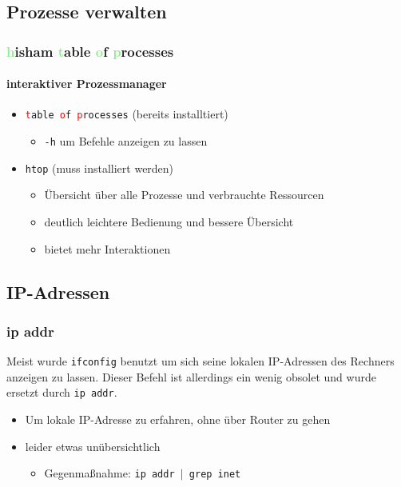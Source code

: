 \documentclass[12pt,utf8]{beamer}
\begin{document}
\subsection{Prozesse verwalten}
\begin{frame}
\frametitle{\textcolor{lightGreen}{h}isham \textcolor{lightGreen}{t}able \textcolor{lightGreen}{o}f \textcolor{lightGreen}{p}rocesses}
\framesubtitle{interaktiver Prozessmanager}
\begin{itemize}
	\item \texttt{\textcolor{red}{t}able \textcolor{red}{o}f \textcolor{red}{p}rocesses} (bereits installtiert)
	\begin{itemize}[<+->]
		\item {\scriptsize \texttt{-h} um Befehle anzeigen zu lassen}
	\end{itemize}
	\item \texttt{htop} (muss installiert werden)
	\begin{itemize}[<+->]
		\item {\scriptsize Übersicht über alle Prozesse und verbrauchte Ressourcen}
		\item {\scriptsize deutlich leichtere Bedienung und bessere Übersicht}
		\item {\scriptsize bietet mehr Interaktionen}
	\end{itemize}
\end{itemize}
\end{frame}

\begin{frame}
	\Huge\centering{\&}
\end{frame}

\subsection{IP-Adressen}
\begin{frame}
	\frametitle{ip addr}
	Meist wurde \texttt{ifconfig} benutzt um sich seine lokalen IP-Adressen des Rechners anzeigen zu lassen. Dieser Befehl ist allerdings ein wenig obsolet und wurde ersetzt durch \texttt{ip addr}.
	\begin{itemize}
		\item Um lokale IP-Adresse zu erfahren, ohne über Router zu gehen
		\item leider etwas unübersichtlich
		\begin{itemize}
			\item {\scriptsize Gegenmaßnahme: \texttt{ip addr $\mid$ grep inet}}
		\end{itemize}
	\end{itemize}
\end{frame}
\end{document}
